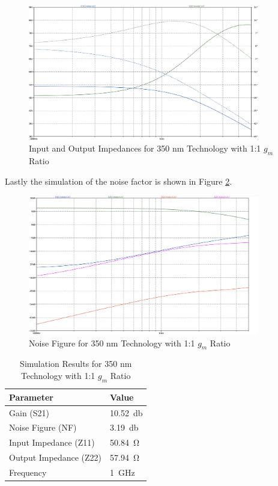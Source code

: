 \begin{figure}[H]
    \centering
    \includegraphics[width=0.9\textwidth]{Images/3501to1ZParam.png}
    \caption{Input and Output Impedances for 350 nm Technology with 1:1 $g_m$ Ratio}
    \label{fig:350nm_1to1-Z}
\end{figure}

Lastly the simulation of the noise factor is shown in Figure \ref{fig:350nm_1to1-NF}.
\begin{figure}[H]
    \centering
    \includegraphics[width=0.9\textwidth]{Images/3501to1SParam.png}
    \caption{Noise Figure for 350 nm Technology with 1:1 $g_m$ Ratio}
    \label{fig:350nm_1to1-NF}
\end{figure}

\begin{table}[H]
    \centering
    \caption{Simulation Results for 350 nm Technology with 1:1 $g_m$ Ratio}
    \begin{tabularx}{\textwidth}{>{\centering\arraybackslash}X >{\centering\arraybackslash}X }
        \toprule
        \textbf{Parameter} & \textbf{Value}\\
        \midrule
        Gain (S21) & \SI{10.52}{\decibel} \\
        \midrule
        Noise Figure (NF) & \SI{3.19}{\decibel} \\
        \midrule
        Input Impedance (Z11) & \SI{50.84}{\ohm} \\
        \midrule
        Output Impedance (Z22) & \SI{57.94}{\ohm} \\
        \midrule
        Frequency & \SI{1}{\giga \hertz} \\
        \bottomrule
    \end{tabularx}
    \label{tab:350nm_1to1_results}
\end{table}

